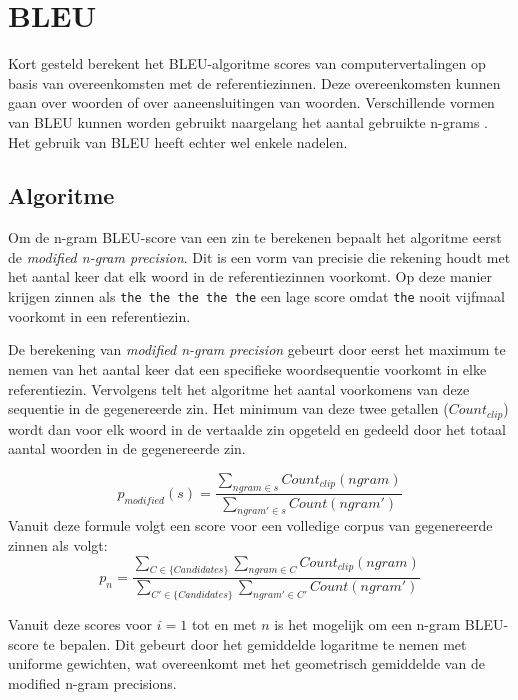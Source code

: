 \section{BLEU}
Kort gesteld berekent het BLEU-algoritme scores van computervertalingen op basis van overeenkomsten met de referentiezinnen. Deze overeenkomsten kunnen gaan over woorden of over aaneensluitingen van woorden. Verschillende vormen van BLEU kunnen worden gebruikt naargelang het aantal gebruikte n-grams . Het gebruik van BLEU heeft echter wel enkele nadelen.

\subsection{Algoritme}
Om de n-gram BLEU-score van een zin te berekenen bepaalt het algoritme eerst de \textit{modified n-gram precision}. Dit is een vorm van precisie die rekening houdt met het aantal keer dat elk woord in de referentiezinnen voorkomt. Op deze manier krijgen zinnen als \texttt{the the the the the} een lage score omdat \texttt{the} nooit vijfmaal voorkomt in een referentiezin. 

De berekening van \textit{modified n-gram precision} gebeurt door eerst het maximum te nemen van het aantal keer dat een specifieke woordsequentie voorkomt in elke referentiezin. Vervolgens telt het algoritme het aantal voorkomens van deze sequentie in de gegenereerde zin. Het minimum van deze twee getallen ($Count_ {clip}$) wordt dan voor elk woord in de vertaalde zin opgeteld en gedeeld door het totaal aantal woorden in de gegenereerde zin.

\begin{equation}
p_{modified}(s) =
\frac{\sum\limits_{ngram \in s} Count_{clip}(ngram)}{\sum\limits_{ngram' \in s} Count(ngram')}
\label{formule:ngramprecision}
\end{equation}
Vanuit deze formule volgt een score voor een volledige corpus van gegenereerde zinnen als volgt:
\begin{equation}
p_{n} =
\frac{\sum\limits_{C \in \{Candidates\} } \sum\limits_{ngram \in C} Count_{clip}(ngram)}{\sum\limits_{C' \in \{Candidates\} } \sum\limits_{ngram' \in C'} Count(ngram')}
\label{formule:corpus_modified}
\end{equation}

Vanuit deze scores voor $i=1$ tot en met $n$ is het mogelijk om een n-gram BLEU-score te bepalen. Dit gebeurt door het gemiddelde logaritme te nemen met uniforme gewichten, wat overeenkomt met het geometrisch gemiddelde van de modified n-gram precisions. 

